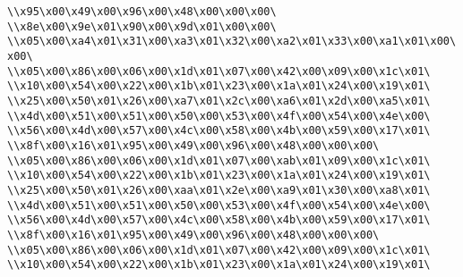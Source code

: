 \verb|\\x95\x00\x49\x00\x96\x00\x48\x00\x00\x00\|\newline
\verb|\\x8e\x00\x9e\x01\x90\x00\x9d\x01\x00\x00\|\newline
\verb|\\x05\x00\xa4\x01\x31\x00\xa3\x01\x32\x00\xa2\x01\x33\x00\xa1\x01\x00\x00\|\newline
\verb|\\x05\x00\x86\x00\x06\x00\x1d\x01\x07\x00\x42\x00\x09\x00\x1c\x01\|\newline
\verb|\\x10\x00\x54\x00\x22\x00\x1b\x01\x23\x00\x1a\x01\x24\x00\x19\x01\|\newline
\verb|\\x25\x00\x50\x01\x26\x00\xa7\x01\x2c\x00\xa6\x01\x2d\x00\xa5\x01\|\newline
\verb|\\x4d\x00\x51\x00\x51\x00\x50\x00\x53\x00\x4f\x00\x54\x00\x4e\x00\|\newline
\verb|\\x56\x00\x4d\x00\x57\x00\x4c\x00\x58\x00\x4b\x00\x59\x00\x17\x01\|\newline
\verb|\\x8f\x00\x16\x01\x95\x00\x49\x00\x96\x00\x48\x00\x00\x00\|\newline
\verb|\\x05\x00\x86\x00\x06\x00\x1d\x01\x07\x00\xab\x01\x09\x00\x1c\x01\|\newline
\verb|\\x10\x00\x54\x00\x22\x00\x1b\x01\x23\x00\x1a\x01\x24\x00\x19\x01\|\newline
\verb|\\x25\x00\x50\x01\x26\x00\xaa\x01\x2e\x00\xa9\x01\x30\x00\xa8\x01\|\newline
\verb|\\x4d\x00\x51\x00\x51\x00\x50\x00\x53\x00\x4f\x00\x54\x00\x4e\x00\|\newline
\verb|\\x56\x00\x4d\x00\x57\x00\x4c\x00\x58\x00\x4b\x00\x59\x00\x17\x01\|\newline
\verb|\\x8f\x00\x16\x01\x95\x00\x49\x00\x96\x00\x48\x00\x00\x00\|\newline
\verb|\\x05\x00\x86\x00\x06\x00\x1d\x01\x07\x00\x42\x00\x09\x00\x1c\x01\|\newline
\verb|\\x10\x00\x54\x00\x22\x00\x1b\x01\x23\x00\x1a\x01\x24\x00\x19\x01\|\newline
